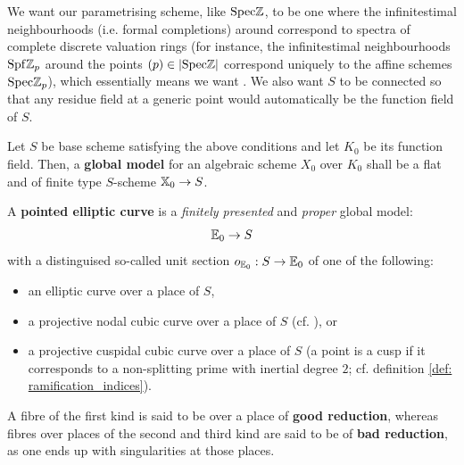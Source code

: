                     \begin{definition} \label{def: global_models}
                        We want our parametrising scheme, like $\mathrm{Spec} \mathbb{Z}$, to be one where the infinitestimal neighbourhoods (i.e. formal completions) around correspond to spectra of complete discrete valuation rings (for instance, the infinitestimal neighbourhoods $\mathrm{Spf} \mathbb{Z}_p$ around the points $(p) \in |\mathrm{Spec} \mathbb{Z}|$ correspond uniquely to the affine schemes $\mathrm{Spec} \mathbb{Z}_p$), which essentially means we want . We also want $S$ to be connected so that any residue field at a generic point would automatically be the function field of $S$.
                        
                        Let $S$ be base scheme satisfying the above conditions and let $K_0$ be its function field. Then, a \textbf{global model} for an algebraic scheme $X_0$ over $K_0$ shall be a flat and of finite type $S$-scheme $\mathbb{X}_0 \to S$. 
                    \end{definition}
                    \begin{remark} \label{remark: global_to_local_for_models}
                        
                    \end{remark}
                    
                    \begin{definition} \label{def: pointed_curves}
                        A \textbf{pointed elliptic curve} is a \textit{finitely presented} and \textit{proper} global model:
                            $$\mathbb{E}_0 \to S$$
                        with a distinguised so-called unit section $o_{\mathbb{E}_0}: S \to \mathbb{E}_0$ of one of the following:
                            \begin{itemize}
                                \item an elliptic curve over a place of $S$,
                                \item a projective nodal cubic curve over a place of $S$ (cf. \cite[\href{https://stacks.math.columbia.edu/tag/0C46}{Tag 0C46}]{stacks}), or
                                \item a projective cuspidal cubic curve over a place of $S$ (a point is a cusp if it corresponds to a non-splitting prime with inertial degree $2$; cf. definition \ref{def: ramification_indices}). 
                            \end{itemize}
                        A fibre of the first kind is said to be over a place of \textbf{good reduction}, whereas fibres over places of the second and third kind are said to be of \textbf{bad reduction}, as one ends up with singularities at those places.
                    \end{definition}
        
